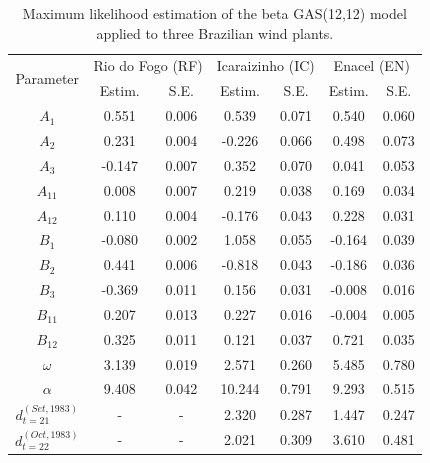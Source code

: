 \documentclass[a4paper]{IEEEtran}
\begin{document}
\begin{table}[htbp]
\centering
\caption{Maximum likelihood estimation of the beta GAS(12,12) model applied to three Brazilian wind plants.}
\label{my-label}
\begin{tabular}{ccccccc}
\multirow{2}{*}{Parameter} & \multicolumn{2}{c}{Rio do Fogo (RF)} & \multicolumn{2}{c}{Icaraizinho (IC)} & \multicolumn{2}{c}{Enacel (EN)} \\
                           & Estim.     & S.E.      & Estim.     & S.E.      & Estim.     & S.E.      \\ \hline
$A_{1}$                    & 0.551      & 0.006     & 0.539     & 0.071      & 0.540      & 0.060     \\
$A_{2}$                    & 0.231      & 0.004     & -0.226      & 0.066     & 0.498     & 0.073     \\
$A_{3}$                    & -0.147     & 0.007     & 0.352      & 0.070     & 0.041      & 0.053     \\
$A_{11}$                   & 0.008      & 0.007     & 0.219      & 0.038     & 0.169      & 0.034     \\
$A_{12}$                   & 0.110       & 0.004     & -0.176      & 0.043     & 0.228     & 0.031     \\
$B_{1}$                    & -0.080      & 0.002     & 1.058      & 0.055     & -0.164      & 0.039     \\
$B_{2}$                    & 0.441      & 0.006     & -0.818     & 0.043     & -0.186     & 0.036     \\
$B_{3}$                    & -0.369     & 0.011     & 0.156    & 0.031     & -0.008       & 0.016     \\
$B_{11}$                   & 0.207      & 0.013     & 0.227      & 0.016     & -0.004       & 0.005      \\
$B_{12}$                   & 0.325      & 0.011     & 0.121      & 0.037     & 0.721      & 0.035     \\
$\omega$                   & 3.139      & 0.019     & 2.571     & 0.260     & 5.485      & 0.780     \\
$\alpha$                   & 9.408      & 0.042     & 10.244     & 0.791     & 9.293      & 0.515     \\
$d_{t=21}^{(Set, 1983)}$   & -          & -         & 2.320      & 0.287     & 1.447          & 0.247         \\
$d_{t=22}^{(Oct, 1983)}$   & -          & -         & 2.021      & 0.309     & 3.610      & 0.481     \\

\end{tabular}
\end{table}
\end{document}
